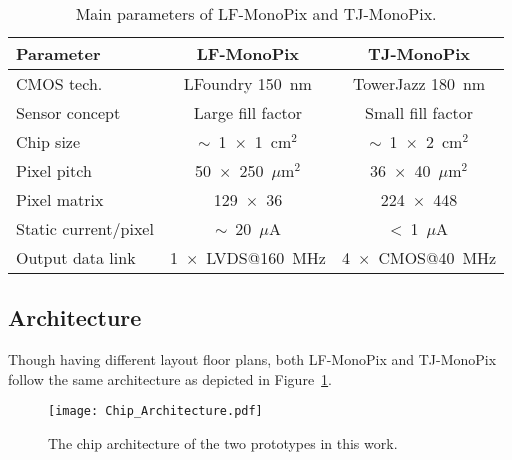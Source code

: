 \documentclass[a4paper,11pt]{article}
\begin{document}
\begin{table}[htbp]
\centering
\caption{\label{tab:Chip} Main parameters of LF-MonoPix and TJ-MonoPix.}
\smallskip
\begin{tabular}{|l|c|c|}
\hline
 Parameter & LF-MonoPix & TJ-MonoPix\\
\hline
CMOS tech. & LFoundry 150~nm & TowerJazz 180~nm\\
\hline
Sensor concept & Large fill factor & Small fill factor\\
\hline
Chip size & $\sim$~1~$\times$~1~cm$^{2}$ & $\sim$~1~$\times$~2~cm$^{2}$\\
\hline
Pixel pitch & 50~$\times$~250~$\mu$m$^{2}$ & 36~$\times$~40~$\mu$m$^{2}$\\
\hline
Pixel matrix & 129~$\times$~36 & 224~$\times$~448\\
\hline
Static current/pixel & $\sim$~20~$\mu$A & <~1~$\mu$A\\
\hline
Output data link & 1~$\times$~LVDS@160~MHz & 4~$\times$~CMOS@40~MHz\\
\hline
\end{tabular}
\end{table}

\subsection{Architecture}
\label{sec:Arch}

Though having different layout floor plans, both LF-MonoPix and TJ-MonoPix follow the same architecture as depicted in Figure~\ref{fig:chip_arch}. 

\begin{figure}[htbp]
	\centering
	\texttt{[image: Chip\_Architecture.pdf]}
	\caption{The chip architecture of the two prototypes in this work.} 
	\label{fig:chip_arch}
\end{figure}
\end{document}
